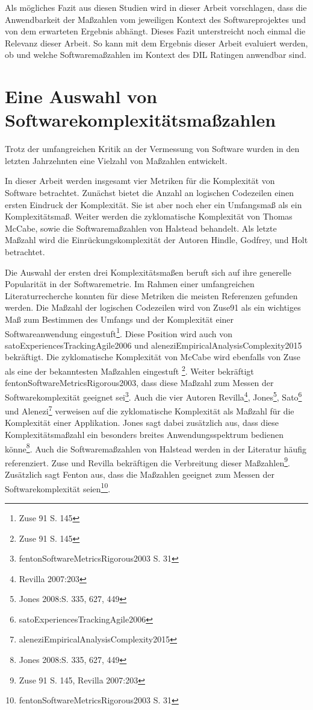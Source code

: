 Als mögliches Fazit aus diesen Studien wird in dieser Arbeit
vorschlagen, dass die Anwendbarkeit der Maßzahlen vom jeweiligen Kontext
des Softwareprojektes und von dem erwarteten Ergebnis abhängt. Dieses
Fazit unterstreicht noch einmal die Relevanz dieser Arbeit. So kann mit
dem Ergebnis dieser Arbeit evaluiert werden, ob und welche
Softwaremaßzahlen im Kontext des DIL Ratingen anwendbar sind.

\section{Eine Auswahl von Softwarekomplexitätsmaßzahlen}\label{eine-auswahl-von-softwarekomplexitatsmasszahlen}

Trotz der umfangreichen Kritik an der Vermessung von Software wurden in
den letzten Jahrzehnten eine Vielzahl von Maßzahlen entwickelt.

In dieser Arbeit werden insgesamt vier Metriken für die Komplexität von
Software betrachtet. Zunächst bietet die Anzahl an logischen Codezeilen
einen ersten Eindruck der Komplexität. Sie ist aber noch eher ein
Umfangsmaß als ein Komplexitätsmaß. Weiter werden die zyklomatische
Komplexität von Thomas McCabe, sowie die Softwaremaßzahlen von Halstead
behandelt. Als letzte Maßzahl wird die Einrückungskomplexität der
Autoren Hindle, Godfrey, und Holt betrachtet.

Die Auswahl der ersten drei Komplexitätsmaßen beruft sich auf ihre
generelle Popularität in der Softwaremetrie. Im Rahmen einer
umfangreichen Literaturrecherche konnten für diese Metriken die meisten
Referenzen gefunden werden. Die Maßzahl der logischen Codezeilen wird
von Zuse91 als ein wichtiges Maß zum Bestimmen des Umfangs und der
Komplexität einer Softwareanwendung eingestuft\footnote{Zuse 91 S. 145}.
Diese Position wird auch von satoExperiencesTrackingAgile2006 und
aleneziEmpiricalAnalysisComplexity2015 bekräftigt. Die zyklomatische
Komplexität von McCabe wird ebenfalls von Zuse als eine der bekanntesten
Maßzahlen eingestuft \footnote{Zuse 91 S. 145}. Weiter bekräftigt
fentonSoftwareMetricsRigorous2003, dass diese Maßzahl zum Messen der
Softwarekomplexität geeignet sei\footnote{fentonSoftwareMetricsRigorous2003
  S. 31}. Auch die vier Autoren Revilla\footnote{Revilla 2007:203},
Jones\footnote{Jones 2008:S. 335, 627, 449}, Sato\footnote{satoExperiencesTrackingAgile2006}
und Alenezi\footnote{aleneziEmpiricalAnalysisComplexity2015} verweisen
auf die zyklomatische Komplexität als Maßzahl für die Komplexität einer
Applikation. Jones sagt dabei zusätzlich aus, dass diese
Komplexitätsmaßzahl ein besonders breites Anwendungsspektrum bedienen
könne\footnote{Jones 2008:S. 335, 627, 449}. Auch die Softwaremaßzahlen
von Halstead werden in der Literatur häufig referenziert. Zuse und
Revilla bekräftigen die Verbreitung dieser Maßzahlen\footnote{Zuse 91 S.
  145, Revilla 2007:203}. Zusätzlich sagt Fenton aus, dass die Maßzahlen
geeignet zum Messen der Softwarekomplexität seien\footnote{fentonSoftwareMetricsRigorous2003
  S. 31}.

